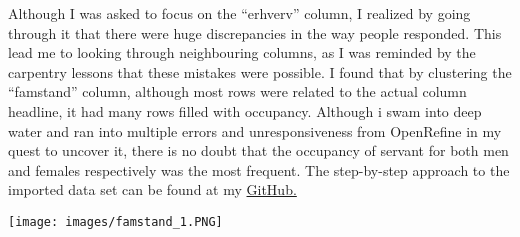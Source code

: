 \documentclass[
]{article}
\begin{document}
Although I was asked to focus on the ``erhverv'' column, I realized by
going through it that there were huge discrepancies in the way people
responded. This lead me to looking through neighbouring columns, as I
was reminded by the carpentry lessons that these mistakes were possible.
I found that by clustering the ``famstand'' column, although most rows
were related to the actual column headline, it had many rows filled with
occupancy. Although i swam into deep water and ran into multiple errors
and unresponsiveness from OpenRefine in my quest to uncover it, there is
no doubt that the occupancy of servant for both men and females
respectively was the most frequent. The step-by-step approach to the
imported data set can be found at my
\href{https://github.com/Emil3103/Digital-Methods/blob/main/Week_02/Scripts/occupany_openrefine.json}{GitHub.}

\texttt{[image: images/famstand\_1.PNG]}
\end{document}
